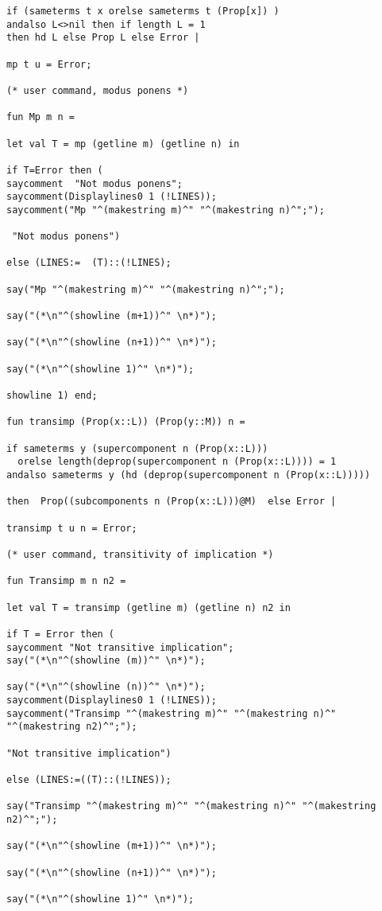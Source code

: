 \documentclass{article}
\begin{document}
{{\begin{verbatim}
if (sameterms t x orelse sameterms t (Prop[x]) )
andalso L<>nil then if length L = 1 
then hd L else Prop L else Error |

mp t u = Error;

(* user command, modus ponens *)

fun Mp m n =

let val T = mp (getline m) (getline n) in

if T=Error then (
saycomment  "Not modus ponens";
saycomment(Displaylines0 1 (!LINES)); 
saycomment("Mp "^(makestring m)^" "^(makestring n)^";");

 "Not modus ponens")

else (LINES:=  (T)::(!LINES);

say("Mp "^(makestring m)^" "^(makestring n)^";");

say("(*\n"^(showline (m+1))^" \n*)"); 

say("(*\n"^(showline (n+1))^" \n*)"); 

say("(*\n"^(showline 1)^" \n*)");

showline 1) end;

fun transimp (Prop(x::L)) (Prop(y::M)) n =

if sameterms y (supercomponent n (Prop(x::L)))
  orelse length(deprop(supercomponent n (Prop(x::L)))) = 1 
andalso sameterms y (hd (deprop(supercomponent n (Prop(x::L)))))

then  Prop((subcomponents n (Prop(x::L)))@M)  else Error |

transimp t u n = Error;

(* user command, transitivity of implication *)

fun Transimp m n n2 =

let val T = transimp (getline m) (getline n) n2 in

if T = Error then (
saycomment "Not transitive implication";
say("(*\n"^(showline (m))^" \n*)"); 

say("(*\n"^(showline (n))^" \n*)"); 
saycomment(Displaylines0 1 (!LINES));
saycomment("Transimp "^(makestring m)^" "^(makestring n)^" "^(makestring n2)^";");

"Not transitive implication")

else (LINES:=((T)::(!LINES));

say("Transimp "^(makestring m)^" "^(makestring n)^" "^(makestring n2)^";");

say("(*\n"^(showline (m+1))^" \n*)"); 

say("(*\n"^(showline (n+1))^" \n*)"); 

say("(*\n"^(showline 1)^" \n*)");


\end{verbatim}}}
\end{document}
